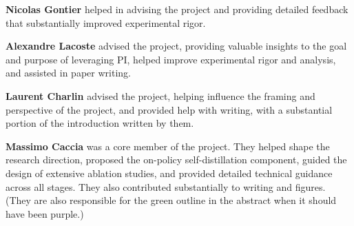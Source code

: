 \documentclass[]{servicenow} %
\begin{document}
\textbf{Nicolas Gontier} helped in advising the project and providing detailed feedback that substantially improved experimental rigor. 

\textbf{Alexandre Lacoste} advised the project, providing valuable insights to the goal and purpose of leveraging PI, helped improve experimental rigor and analysis, and assisted in paper writing.

\textbf{Laurent Charlin} advised the project, helping influence the framing and perspective of the project, and provided help with writing, with a substantial portion of the introduction written by them. 

\textbf{Massimo Caccia} was a core member of the project. They helped shape the research direction, proposed the on-policy self-distillation component, guided the design of extensive ablation studies, and provided detailed technical guidance across all stages. They also contributed substantially to writing and figures. (They are also responsible for the green outline in the abstract when it should have been purple.)

\newpage



\appendix

\end{document}
